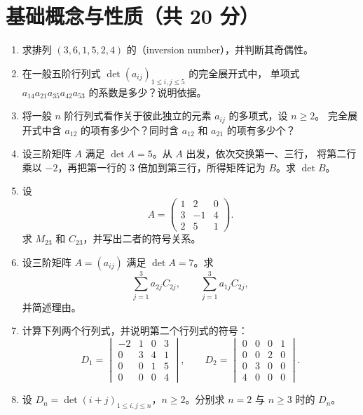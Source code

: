 \documentclass[UTF8,12pt,a4paper,fontset=fandol]{ctexart}
\begin{document}
\section{基础概念与性质（共 20 分）}
\begin{enumerate}[label=\arabic*.,series=detquestions]

\item\label{q:inversions}
求排列 $(3,6,1,5,2,4)$ 的（inversion number），并判断其奇偶性。

\item\label{q:term-sign}
在一般五阶行列式 $\det(a_{ij})_{1\leq i,j\leq5}$ 的完全展开式中，
单项式 $a_{14}a_{21}a_{35}a_{42}a_{53}$ 的系数是多少？说明依据。

\item\label{q:count-terms}
将一般 $n$ 阶行列式看作关于彼此独立的元素 $a_{ij}$ 的多项式，设 $n\geq2$。
完全展开式中含 $a_{12}$ 的项有多少个？同时含 $a_{12}$ 和 $a_{21}$ 的项有多少个？

\item\label{q:row-operations}
设三阶矩阵 $A$ 满足 $\det A=5$。从 $A$ 出发，依次交换第一、三行，
将第二行乘以 $-2$，再把第一行的 $3$ 倍加到第三行，所得矩阵记为 $B$。求 $\det B$。

\item\label{q:minor-cofactor}
设
\[
A=\begin{pmatrix}1&2&0\\3&-1&4\\2&5&1\end{pmatrix}.
\]
求 $M_{23}$ 和 $C_{23}$，并写出二者的符号关系。

\item\label{q:cofactor-sums}
设三阶矩阵 $A=(a_{ij})$ 满足 $\det A=7$。求
\[
\sum_{j=1}^{3}a_{2j}C_{2j},\qquad
\sum_{j=1}^{3}a_{1j}C_{2j},
\]
并简述理由。

\item\label{q:triangular}
计算下列两个行列式，并说明第二个行列式的符号：
\[
D_1=\begin{vmatrix}-2&1&0&3\\0&3&4&1\\0&0&1&5\\0&0&0&4\end{vmatrix},
\qquad
D_2=\begin{vmatrix}0&0&0&1\\0&0&2&0\\0&3&0&0\\4&0&0&0\end{vmatrix}.
\]

\item\label{q:dependent-rows}
设 $D_n=\det(i+j)_{1\leq i,j\leq n}$，$n\geq2$。分别求 $n=2$ 与 $n\geq3$ 时的 $D_n$。


\end{enumerate}
\end{document}

